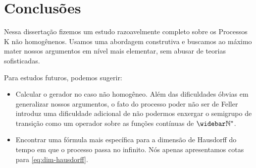 \chapter{Conclusões}
\label{cap:conclusao}

Nessa dissertação fizemos um estudo razoavelmente completo sobre os
Processos K não homogênenos. Usamos uma abordagem construtiva e
buscamos ao máximo mater nossos argumentos em nível mais elementar,
sem abusar de teorias sofisticadas.

Para estudos futuros, podemos sugerir:

\begin{itemize}
\item Calcular o gerador no caso não homogêneo. Além das dificuldades
  óbvias em generalizar nossos argumentos, o fato do processo poder
  não ser de Feller introduz uma dificuldade adicional de não podermos
  enxergar o semigrupo de transição como um operador sobre as funções
  contínuas de $\Nzb$.

\item Encontrar uma fórmula mais específica para a dimensão de
  Hausdorff do tempo em que o processo passa no infinito. Nós
  apenas apresentamos cotas para \eqref{eq:dim-hausdorff}.
\end{itemize}



